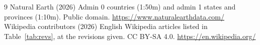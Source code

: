 \documentclass[11pt,a4paper]{article}
\begin{document}
\begin{thebibliography}{9}
 Natural Earth (2026) Admin 0 countries (1:50m) and admin 1 states and provinces (1:10m). Public domain. \url{https://www.naturalearthdata.com/}
 Wikipedia contributors (2026) English Wikipedia articles listed in Table~\ref{tab:revs}, at the revisions given. CC BY-SA 4.0. \url{https://en.wikipedia.org/}
\end{thebibliography}
\end{document}
